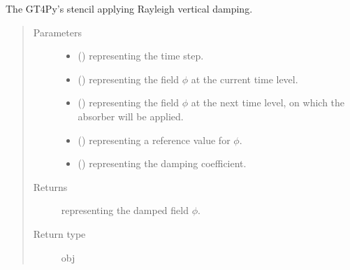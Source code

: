 \documentclass[letterpaper,10pt,english]{sphinxmanual}
\begin{document}
\begin{fulllineitems}

\begin{fulllineitems}
\label{\detokenize{api:dycore.vertical_damping.VerticalDampingRayleigh._stencil_defs}}
The GT4Py’s stencil applying Rayleigh vertical damping.
\begin{quote}\begin{description}
\item[{Parameters}] \leavevmode\begin{itemize}
\item {} 
 () \textendash{}  representing the time step.

\item {} 
 () \textendash{}  representing the field \(\phi\) at the current time level.

\item {} 
 () \textendash{}  representing the field \(\phi\) at the next time level, on
which the absorber will be applied.

\item {} 
 () \textendash{}  representing a reference value for \(\phi\).

\item {} 
 () \textendash{}  representing the damping coefficient.

\end{itemize}

\item[{Returns}] \leavevmode
{} representing the damped field \(\phi\).

\item[{Return type}] \leavevmode
obj

\end{description}\end{quote}

\end{fulllineitems}


\end{fulllineitems}
\end{document}
